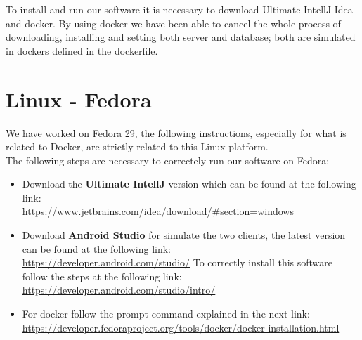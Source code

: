 To install and run our software it is necessary to download Ultimate IntellJ Idea and docker. By using docker we have been able to cancel the whole process of downloading, installing and setting both server and database; both are simulated in dockers defined in the dockerfile.

\section{Linux - Fedora}
We have worked on Fedora 29, the following instructions, especially for what is related to Docker, are strictly related to this Linux platform.\\
The following steps are necessary to correctely run our software on Fedora:
\begin{itemize}
	\item Download the \textbf{Ultimate IntellJ} version which can be found at the following link:\\
 		\url{https://www.jetbrains.com/idea/download/#section=windows}

	\item Download \textbf{Android Studio} for simulate the two clients, the latest version can be found at the following link:\\
		\url{https://developer.android.com/studio/}
		To correctly install this software follow the steps at the following link:\\
		\url{https://developer.android.com/studio/intro/}

	\item For docker follow the prompt command explained in the next link:\\
		\url{https://developer.fedoraproject.org/tools/docker/docker-installation.html}\\



\end{itemize}
